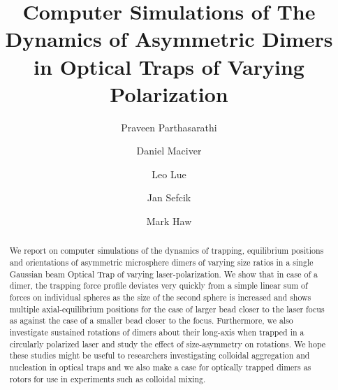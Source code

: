 \documentclass[preprint,  3p]{elsarticle}
\begin{document}
	\begin{frontmatter}
		\title{Computer Simulations of The Dynamics of Asymmetric Dimers in Optical Traps of Varying Polarization}
		
\author[aff1]{Praveen Parthasarathi}

\author[aff1]{Daniel Maciver}

\author[aff1]{Leo Lue}

\author[aff1]{Jan Sefcik}

\author[aff1]{Mark Haw}


\begin{abstract}
%
We report on computer simulations of the dynamics of trapping, equilibrium positions and orientations of asymmetric microsphere dimers of varying size ratios in a single Gaussian beam Optical Trap of varying laser-polarization. We show that in case of a dimer, the trapping force profile deviates very quickly from a simple linear sum of forces on individual spheres as the size of the second sphere is increased and shows multiple axial-equilibrium positions for the case of larger bead closer to the laser focus as against the case of a smaller bead closer to the focus. Furthermore, we also investigate sustained rotations of dimers about their long-axis when trapped in a circularly polarized laser and study the effect of size-asymmetry on rotations. We hope these studies might be useful to researchers investigating colloidal aggregation and nucleation in optical traps and we also make a case for optically trapped dimers as rotors for use in experiments such as colloidal mixing.  
\end{abstract}
		
		

\end{frontmatter}
\end{document}
